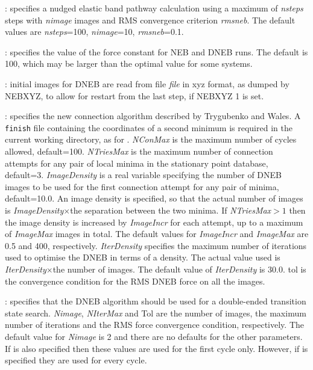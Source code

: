 {{{: specifies a nudged elastic band pathway 
calculation\cite{HenkelmanJ00,HenkelmanUJ00} using a maximum of {\it nsteps\/} steps with
{\it nimage\/} images and RMS convergence criterion {\it rmsneb\/}. The default values are
{\it nsteps\/}=100, {\it nimage\/}=10, {\it rmsneb\/}=0.1.

: specifies the value of the force constant for NEB and 
DNEB runs. The default is 100, which may be larger than the optimal
value for some systems.

: initial images for DNEB are read from file {\it file} 
in xyz format, as dumped by {NEBXYZ\/}, to allow for restart from the last 
step, if {NEBXYZ 1\/} is set. 

: 
specifies the new connection algorithm described by Trygubenko and Wales.\cite{TrygubenkoW04}
A {\tt finish} file containing the coordinates of a second minimum is required in the
current working directory, as for .
{\it NConMax\/} is the maximum number of cycles allowed, default=100. 
{\it NTriesMax\/} is the maximum number of connection attempts for any pair of
local minima in the stationary point database, default=3. 
{\it ImageDensity\/} is a real variable specifying the number of DNEB images to be used for
the first connection attempt for any pair of minima, default=10.0. 
An image density is specified, so that the actual number of images is {\it ImageDensity\/}$\times$the
separation between the two minima.
If {\it NTriesMax}$>1$ then 
the image density is increased by {\it ImageIncr\/} for each attempt, up to
a maximum of {\it ImageMax\/} images in total. 
The default values for {\it ImageIncr\/} and {\it ImageMax\/} are 0.5 and 400, respectively.
{\it IterDensity\/} specifies the maximum number of iterations used to optimise the
DNEB in terms of a density. The actual value used is {\it IterDensity\/}$\times$the
number of images.
The default value of {\it IterDensity\/} is 30.0.
{tol\/} is the convergence condition for the RMS DNEB force on all the
images. 

:
specifies that the DNEB algorithm\cite{TrygubenkoW04} 
should be used for a double-ended transition state search.
{\it Nimage\/}, {\it NIterMax\/} and {Tol} are the number of images, the maximum
number of iterations and the RMS force convergence condition, respectively. 
The default value for {\it Nimage\/} is 2 and there are no defaults for the other parameters.
If  is also specified then these values are used for the first 
cycle only. However, if  is specified they are used for every cycle.

}}}

